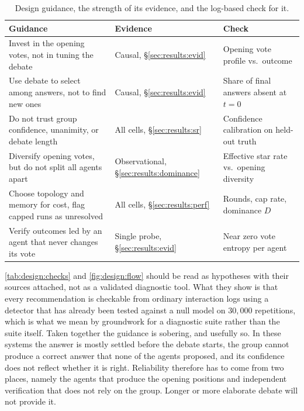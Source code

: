\begin{table}[H]
\centering
\small
\begin{tabular}{>{\raggedright\arraybackslash}p{6.2cm}>{\raggedright\arraybackslash}p{2.8cm}>{\raggedright\arraybackslash}p{4.4cm}}
\toprule
Guidance & Evidence & Check \\
\midrule
Invest in the opening votes, not in tuning the debate
  & Causal, \S\ref{sec:results:evid}
  & Opening vote profile vs.\ outcome \\
\addlinespace
Use debate to select among answers, not to find new ones
  & Causal, \S\ref{sec:results:evid}
  & Share of final answers absent at $t=0$ \\
\addlinespace
Do not trust group confidence, unanimity, or debate length
  & All cells, \S\ref{sec:results:sr}
  & Confidence calibration on held-out truth \\
\addlinespace
Diversify opening votes, but do not split all agents apart
  & Observational, \S\ref{sec:results:dominance}
  & Effective star rate vs.\ opening diversity \\
\addlinespace
Choose topology and memory for cost, flag capped runs as unresolved
  & All cells, \S\ref{sec:results:perf}
  & Rounds, cap rate, dominance $D$ \\
\addlinespace
Verify outcomes led by an agent that never changes its vote
  & Single probe, \S\ref{sec:results:evid}
  & Near zero vote entropy per agent \\
\bottomrule
\end{tabular}
\caption[Design guidance mapped to evidence and checks]{Design guidance, the
         strength of its evidence, and the log-based check for it.}
\label{tab:design:checks}
\end{table}

\autoref{tab:design:checks} and \autoref{fig:design:flow} should be read as
hypotheses with their sources attached, not as a validated diagnostic tool.
What they show is that every recommendation is checkable from ordinary interaction logs using a \suitename{} detector that has already
been tested against a null model on $30{,}000$ repetitions, which is what we mean
by groundwork for a diagnostic suite rather than the suite itself. Taken together
the guidance is sobering, and usefully so. In these systems the answer is mostly
settled before the debate starts, the group cannot produce a correct answer that
none of the agents proposed, and its confidence does not reflect whether it is
right. Reliability therefore has to come from two places, namely the agents that
produce the opening positions and independent verification that does not rely
on the group. Longer or more elaborate debate will not provide it.

